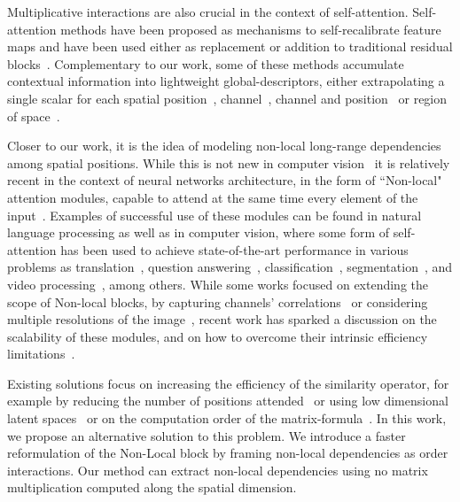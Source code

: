 \documentclass[10pt,twocolumn,letterpaper]{article}
\begin{document}
 Multiplicative interactions are also crucial in the context of self-attention. Self-attention methods have been proposed as mechanisms to self-recalibrate feature maps and have been used either as replacement or addition to traditional residual blocks~\cite{he2016deep}.
 Complementary to our work, some of these methods accumulate contextual information into lightweight global-descriptors, either extrapolating a single scalar for each spatial position~\cite{wang2017residual}, channel~\cite{hu2018squeeze, cao2019gcnet}, channel and position~\cite{woo2018cbam} or region of space~\cite{li2019spatial}.
 
 Closer to our work, it is the idea of modeling non-local long-range dependencies among spatial positions. While this is not new in computer vision~\cite{buades2005non, lafferty2001conditional, dabov2007image} it is relatively recent in the context of neural networks architecture, in the form of ``Non-local" attention modules, capable to attend at the same time every element of the input~\cite{wang2018non, vaswani2017attention}. Examples of successful use of these modules can be found in natural language processing as well as in computer vision, where some form of self-attention has been used to achieve state-of-the-art performance in various problems as translation~\cite{ott2018scaling},  question answering~\cite{mohamed2019transformers}, classification~\cite{ramachandran2019stand, Bello_2019_ICCV}, segmentation~\cite{wang2020axial, carion2020end}, and video processing~\cite{wang2019edvr}, among others. While some works focused on extending the scope of Non-local blocks, by capturing channels' correlations~\cite{babiloni2020tesa, yue2018compact, fu2019dual} or considering multiple resolutions of the image~\cite{mei2020pyramid, dai2019second}, recent work has sparked a discussion on the scalability of these modules, and on how to overcome their  intrinsic efficiency limitations~\cite{tay2020efficient}.
 
 
Existing solutions focus on increasing the efficiency of the similarity operator, for example by reducing the number of positions attended~\cite{child2019generating, zhang2020dynamic} or using low dimensional latent spaces~\cite{choromanski2020rethinking, zhang2019latentgnn, chen2019graph, wang2020linformer} or on the computation order of the matrix-formula~\cite{shen2021efficient, katharopoulos2020transformers}. In this work, we propose an alternative solution to this problem.  We introduce a faster reformulation of the Non-Local block by framing non-local dependencies as  order interactions. Our method can extract non-local dependencies using no matrix multiplication computed along the spatial dimension.
\end{document}
